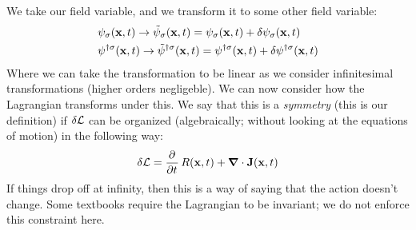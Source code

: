 We take our field variable, and we transform it to some other field variable:
\begin{equation}
    \begin{split}
        &\psi_\sigma(\mathbf{x}, t) \to \tilde{\psi}_\sigma(\mathbf{x}, t) = \psi_\sigma(\mathbf{x}, t) + \delta\psi_\sigma(\mathbf{x}, t)
        \\ &\psi^{\dagger\sigma}(\mathbf{x}, t) \to \tilde{\psi}^{\dagger\sigma}(\mathbf{x}, t) = \psi^{\dagger\sigma}(\mathbf{x}, t) + \delta\psi^{\dagger\sigma}(\mathbf{x}, t)
    \end{split}
\end{equation}
Where we can take the transformation to be linear as we consider infinitesimal transformations (higher orders negligeble). We can now consider how the Lagrangian transforms under this. We say that this is a \emph{symmetry} (this is our definition) if $\delta \mathcal{L}$ can be organized (algebraically; without looking at the equations of motion) in the following way:
\begin{equation}\label{eq-Lsymmetry}
    \delta \L = \dpd{}{t}R(\v{x}, t) + \nabla \cdot \v{J}(\v{x}, t)
\end{equation}
If things drop off at infinity, then this is a way of saying that the action doesn't change. Some textbooks require the Lagrangian to be invariant; we do not enforce this constraint here.

